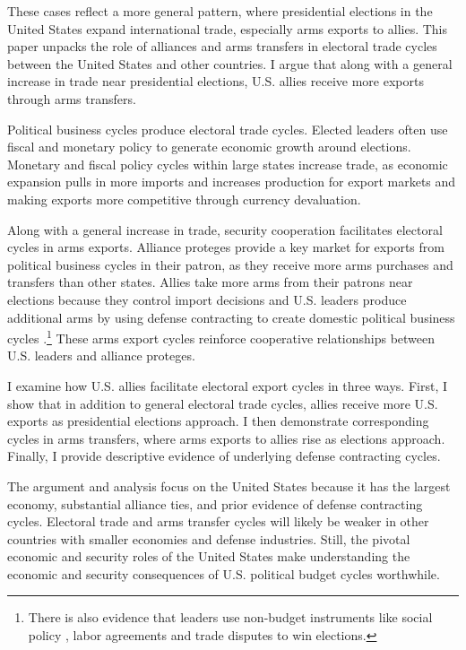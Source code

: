 \documentclass[12pt]{article}
\begin{document}
These cases reflect a more general pattern, where presidential elections in the United States expand international trade, especially arms exports to allies.
This paper unpacks the role of alliances and arms transfers in electoral trade cycles between the United States and other countries. 
I argue that along with a general increase in trade near presidential elections, U.S. allies receive more exports through arms transfers.


Political business cycles produce electoral trade cycles.
Elected leaders often use fiscal and monetary policy \citep{Nordhaus1975, Tufte1978, Rogoff1987, ClarkHallerberg2000} to generate economic growth around elections. 
Monetary and fiscal policy cycles within large states increase trade, as economic expansion pulls in more imports and increases production for export markets and making exports more competitive through currency devaluation. 


Along with a general increase in trade, security cooperation facilitates electoral cycles in arms exports. 
Alliance proteges provide a key market for exports from political business cycles in their patron, as they receive more arms purchases and transfers than other states. 
Allies take more arms from their patrons near elections because they control import decisions and U.S. leaders produce additional arms by using defense contracting to create domestic political business cycles \citep{Tufte1978, Mintz1988, Mayer1995, DerouenHeo2000, Becker2021}.\footnote{There is also evidence that leaders use non-budget instruments like social policy \citep{Philips2020}, labor agreements \citep{Ahlquist2010} and trade disputes \citep{Conconietal2017} to win elections. }
These arms export cycles reinforce cooperative relationships between U.S. leaders and alliance proteges.


I examine how U.S. allies facilitate electoral export cycles in three ways. 
First, I show that in addition to general electoral trade cycles, allies receive more U.S. exports as presidential elections approach.
I then demonstrate corresponding cycles in arms transfers, where arms exports to allies rise as elections approach.  
Finally, I provide descriptive evidence of underlying defense contracting cycles.


The argument and analysis focus on the United States because it has the largest economy, substantial alliance ties, and prior evidence of defense contracting cycles. 
Electoral trade and arms transfer cycles will likely be weaker in other countries with smaller economies and defense industries. 
Still, the pivotal economic and security roles of the United States make understanding the economic and security consequences of U.S. political budget cycles worthwhile.
\end{document}
